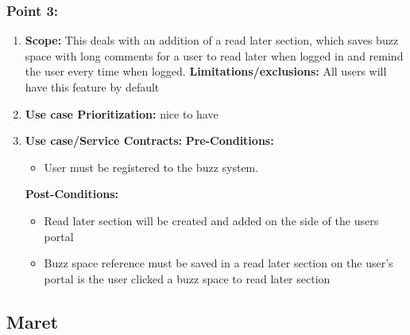 \documentclass[11pt]{article}
\begin{document}
\subsubsection{Point 3:} 
\begin{enumerate}
\item 
\textbf{Scope:}
This deals with an addition of a read later section, which saves buzz space with long comments for a user to read later when logged in and remind the user every time when logged.
\newline
\textbf{Limitations/exclusions:} 
All users will have this feature by default
\item 
\textbf{Use case Prioritization:} nice to have

\item 
\textbf{Use case/Service Contracts:} 
\newline
\textbf{Pre-Conditions: }
\begin{itemize}
\item User must be registered to the buzz system.
\end{itemize}
 

\textbf{Post-Conditions: }
\begin{itemize}
\item Read later section will be created and added on the side of the users portal
\item Buzz space reference must be saved in a read later section on the user's portal is the user clicked a buzz space to read later section 
\end{itemize}
\end{enumerate}
\newpage

\subsection{Maret}
\end{document}
